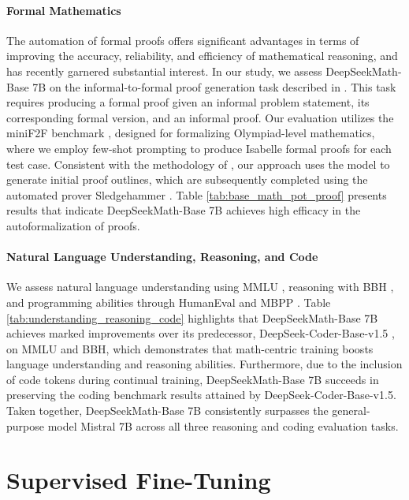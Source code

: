 \begin{itemize}[topsep=0pt]
\paragraph{Formal Mathematics}

The automation of formal proofs offers significant advantages in terms of improving the accuracy, reliability, and efficiency of mathematical reasoning, and has recently garnered substantial interest. In our study, we assess DeepSeekMath-Base 7B on the informal-to-formal proof generation task described in \citep{dsp_proof}. This task requires producing a formal proof given an informal problem statement, its corresponding formal version, and an informal proof. Our evaluation utilizes the miniF2F benchmark \citep{minif2f}, designed for formalizing Olympiad-level mathematics, where we employ few-shot prompting to produce Isabelle formal proofs for each test case. Consistent with the methodology of \cite{dsp_proof}, our approach uses the model to generate initial proof outlines, which are subsequently completed using the automated prover Sledgehammer \citep{sledgehammer}. Table \ref{tab:base_math_pot_proof} presents results that indicate DeepSeekMath-Base 7B achieves high efficacy in the autoformalization of proofs.

\paragraph{Natural Language Understanding, Reasoning, and Code}

We assess natural language understanding using MMLU \citep{mmlu}, reasoning with BBH \citep{bbh}, and programming abilities through HumanEval \citep{codex} and MBPP \citep{mbpp}. Table \ref{tab:understanding_reasoning_code} highlights that DeepSeekMath-Base 7B achieves marked improvements over its predecessor, DeepSeek-Coder-Base-v1.5 \citep{deepseek-coder}, on MMLU and BBH, which demonstrates that math-centric training boosts language understanding and reasoning abilities. Furthermore, due to the inclusion of code tokens during continual training, DeepSeekMath-Base 7B succeeds in preserving the coding benchmark results attained by DeepSeek-Coder-Base-v1.5. Taken together, DeepSeekMath-Base 7B consistently surpasses the general-purpose model Mistral 7B \citep{mistral} across all three reasoning and coding evaluation tasks.

\section{Supervised Fine-Tuning}


\end{itemize}
